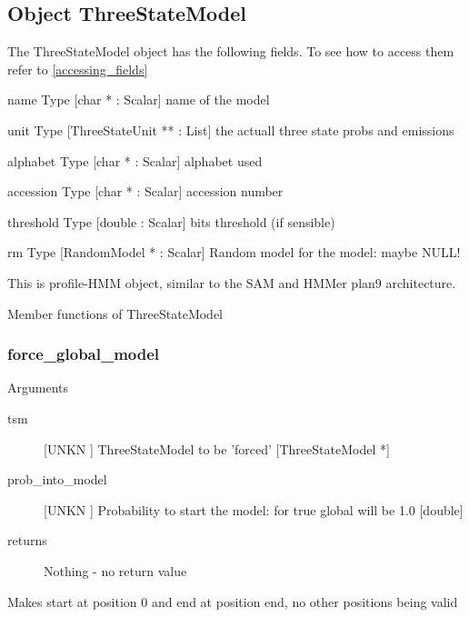 \subsection{Object ThreeStateModel}

\label{object_ThreeStateModel}

The ThreeStateModel object has the following fields. To see how to access them refer to \ref{accessing_fields}
\begin{description}
\item{name} Type [char * : Scalar]  name of the model

\item{unit} Type [ThreeStateUnit ** : List]  the actuall three state probs and emissions

\item{alphabet} Type [char * : Scalar]  alphabet used 

\item{accession} Type [char * : Scalar]  accession number

\item{threshold} Type [double : Scalar]  bits threshold (if sensible)

\item{rm} Type [RandomModel * : Scalar]  Random model for the model: maybe NULL!

\end{description}
This is profile-HMM object, similar to the
SAM and HMMer plan9 architecture. 




Member functions of ThreeStateModel

\subsubsection{force_global_model}

Arguments
\begin{description}
\item[tsm] [UNKN ] ThreeStateModel to be 'forced' [ThreeStateModel *]
\item[prob_into_model] [UNKN ] Probability to start the model: for true global will be 1.0 [double]
\item[returns] Nothing - no return value
\end{description}
Makes start at position 0 and end at position end,
no other positions being valid





